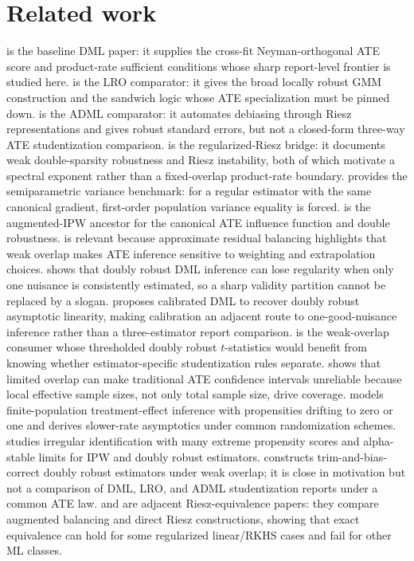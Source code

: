 \documentclass[11pt]{article}
\theoremstyle{definition}
\theoremstyle{plain}
\theoremstyle{remark}
\begin{document}
\section{Related work}
\citet{ChernozhukovEtAl2018ECTJ} is the baseline DML paper: it supplies the
cross-fit Neyman-orthogonal ATE score and product-rate sufficient conditions
whose sharp report-level frontier is studied here.  \citet{ChernozhukovEscancianoIchimuraNeweyRobins2022LRO}
is the LRO comparator: it gives the broad locally robust GMM construction and
the sandwich logic whose ATE specialization must be pinned down.  \citet{ChernozhukovNeweySingh2022ADML}
is the ADML comparator: it automates debiasing through Riesz representations
and gives robust standard errors, but not a closed-form three-way ATE
studentization comparison.  \citet{ChernozhukovNeweySingh2022RR} is the
regularized-Riesz bridge: it documents weak double-sparsity robustness and
Riesz instability, both of which motivate a spectral exponent rather than a
fixed-overlap product-rate boundary.  \citet{Newey1994Econometrica} provides
the semiparametric variance benchmark: for a regular estimator with the same
canonical gradient, first-order population variance equality is forced.
\citet{RobinsRotnitzkyZhao1994JASA} is the augmented-IPW ancestor for the
canonical ATE influence function and double robustness.  \citet{AtheyImbensWager2018JRSSB}
is relevant because approximate residual balancing highlights that weak
overlap makes ATE inference sensitive to weighting and extrapolation choices.
\citet{DukesVansteelandtWhitney2024JMLR} shows that doubly robust DML inference
can lose regularity when only one nuisance is consistently estimated, so a
sharp validity partition cannot be replaced by a slogan.  \citet{VanDerLaanLuedtkeCarone2024CDML}
proposes calibrated DML to recover doubly robust asymptotic linearity, making
calibration an adjacent route to one-good-nuisance inference rather than a
three-estimator report comparison.  \citet{Dorn2025WeakOverlapDR} is the
weak-overlap consumer whose thresholded doubly robust \(t\)-statistics would
benefit from knowing whether estimator-specific studentization rules separate.
\citet{Rothe2017LimitedOverlapCI} shows that limited overlap can make
traditional ATE confidence intervals unreliable because local effective sample
sizes, not only total sample size, drive coverage.  \citet{HongLeungLi2020LimitedOverlap}
models finite-population treatment-effect inference with propensities drifting
to zero or one and derives slower-rate asymptotics under common randomization
schemes.  \citet{HeilerKazak2021ExtremePS} studies irregular identification
with many extreme propensity scores and alpha-stable limits for IPW and
doubly robust estimators.  \citet{MaSantAnnaSasakiUra2026WeakOverlapDR}
constructs trim-and-bias-correct doubly robust estimators under weak overlap;
it is close in motivation but not a comparison of DML, LRO, and ADML
studentization reports under a common ATE law.
\citet{BrunsSmithDukesFellerOgburn2024ABW} and \citet{BrunsSmith2026RieszApproaches}
are adjacent Riesz-equivalence papers: they compare augmented balancing and
direct Riesz constructions, showing that exact equivalence can hold for some
regularized linear/RKHS cases and fail for other ML classes.
\end{document}
